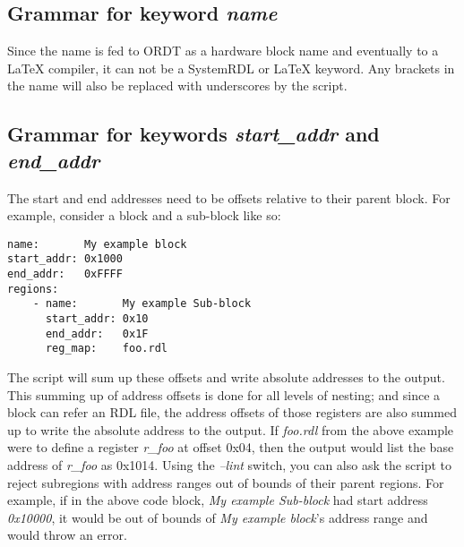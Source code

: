 \documentclass{tropic_design_spec}
\begin{document}
\pagebreak
\subsection{Grammar for keyword \textit{name}}

Since the name is fed to ORDT as a hardware block name and eventually to a LaTeX compiler,
it can not be a SystemRDL or LaTeX keyword. Any brackets in the name will also be replaced 
with underscores by the script.

\subsection{Grammar for keywords \textit{start_addr} and \textit{end_addr}}

The start and end addresses need to be offsets relative to their parent block.
For example, consider a block and a sub-block like so:
\begin{lstlisting}
name:       My example block
start_addr: 0x1000
end_addr:   0xFFFF
regions:
    - name:       My example Sub-block
      start_addr: 0x10
      end_addr:   0x1F
      reg_map:    foo.rdl
\end{lstlisting}
The script will sum up these offsets and write absolute addresses to the output.
This summing up of address offsets is done for all levels of nesting; and
since a block can refer an RDL file, the address offsets of those registers are also
summed up to write the absolute address to the output. \newline
If \textit{foo.rdl} from the above example were to define a register \textit{r_foo}
at offset 0x04, then the output would list the base address of \textit{r_foo} as 0x1014.
\newline
Using the \textit{--lint} switch, you can also ask the script to reject subregions
with address ranges out of bounds of their parent regions. For example, if in the above
code block, \textit{My example Sub-block} had start address \textit{0x10000}, it would be
out of bounds of \textit{My example block}'s address range and would throw an error.

\pagebreak
\end{document}
